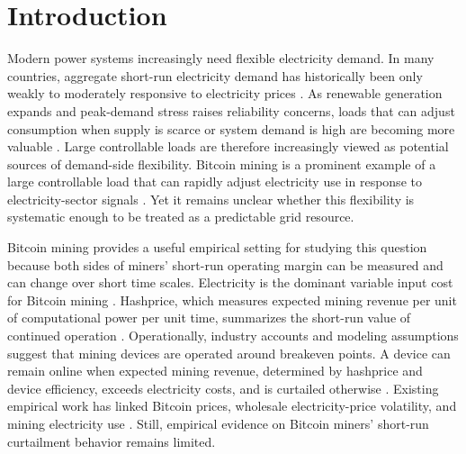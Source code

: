\documentclass[pdflatex,sn-mathphys-num]{sn-jnl}%
\theoremstyle{thmstyleone}%
\theoremstyle{thmstyletwo}%
\theoremstyle{thmstylethree}%
\begin{document}
\maketitle

\section{Introduction}\label{sec1}

Modern power systems increasingly need flexible electricity demand. In many countries, aggregate short-run electricity demand has historically been only weakly to moderately responsive to electricity prices \cite{lijesen2007real, labandeira2017meta, burke2018price, zhu2018meta, hirth2024aggregate}. As renewable generation expands and peak-demand stress raises reliability concerns, loads that can adjust consumption when supply is scarce or system demand is high are becoming more valuable \cite{martinot2016grid, brunner2020future, IEA2025DemandFlexibility, suna2022assessment}. Large controllable loads are therefore increasingly viewed as potential sources of demand-side flexibility. Bitcoin mining is a prominent example of a large controllable load that can rapidly adjust electricity use in response to electricity-sector signals \cite{NERC_LargeLoads_2025, dlapiper2023_role_bitcoin_mining_renewables, PUCT2024_VirtualCurrencyMiningRegistration, gallant2024medicinehat, cpower2024blockfusion, blackhills2024blockchain}. Yet it remains unclear whether this flexibility is systematic enough to be treated as a predictable grid resource.

Bitcoin mining provides a useful empirical setting for studying this question because both sides of miners' short-run operating margin can be measured and can change over short time scales. Electricity is the dominant variable input cost for Bitcoin mining \cite{DEVRIES2018801}. Hashprice, which measures expected mining revenue per unit of computational power per unit time, summarizes the short-run value of continued operation \cite{hashrateindex2025bitcoinhashprice, neumueller2025cambridge}. Operationally, industry accounts and modeling assumptions suggest that mining devices are operated around breakeven points. A device can remain online when expected mining revenue, determined by hashprice and device efficiency, exceeds electricity costs, and is curtailed otherwise \cite{Bratcher2024, menati2023optimization, hajiaghapour2022approach, garratt2015entry}. Existing empirical work has linked Bitcoin prices, wholesale electricity-price volatility, and mining electricity use \cite{sapra2024uncovering, aye2023pricing}. Still, empirical evidence on Bitcoin miners' short-run curtailment behavior remains limited.
\end{document}
